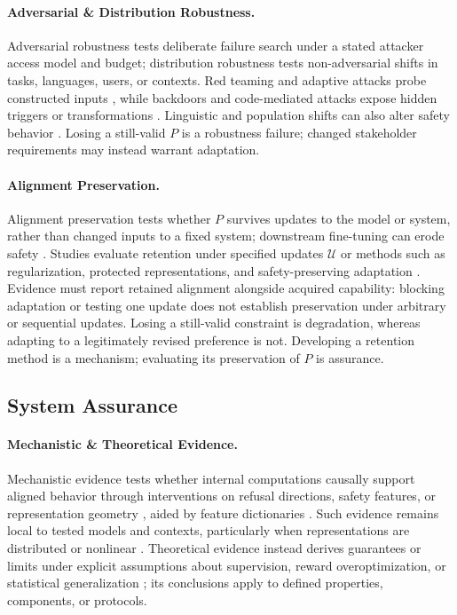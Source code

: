 \documentclass[11pt]{article}
\begin{document}
\paragraph{Adversarial \& Distribution Robustness.}
Adversarial robustness tests deliberate failure search under a stated attacker access model and budget; distribution robustness tests non-adversarial shifts in tasks, languages, users, or contexts. Red teaming and adaptive attacks probe constructed inputs \citep{mazeika2024harmbench,andriushchenko2025adaptive}, while backdoors and code-mediated attacks expose hidden triggers or transformations \citep{wang2024backdooralign,ren2024codeattack}. Linguistic and population shifts can also alter safety behavior \citep{long2026languagegames,brito2026safetyisnotuniversal,choi2026context}. Losing a still-valid \(P\) is a robustness failure; changed stakeholder requirements may instead warrant adaptation.

\paragraph{Alignment Preservation.}
Alignment preservation tests whether \(P\) survives updates to the model or system, rather than changed inputs to a fixed system; downstream fine-tuning can erode safety \citep{qi2024finetuning}. Studies evaluate retention under specified updates \(\mathcal{U}\) or methods such as regularization, protected representations, and safety-preserving adaptation \citep{lyu2024keeping,huang2024vaccine,li2025salora,wang2025lifelong}. Evidence must report retained alignment alongside acquired capability: blocking adaptation or testing one update does not establish preservation under arbitrary or sequential updates. Losing a still-valid constraint is degradation, whereas adapting to a legitimately revised preference is not. Developing a retention method is a mechanism; evaluating its preservation of \(P\) is assurance.

\subsection{System Assurance}
\label{subsec:system-assurance}

\paragraph{Mechanistic \& Theoretical Evidence.}
Mechanistic evidence tests whether internal computations causally support aligned behavior through interventions on refusal directions, safety features, or representation geometry \citep{arditi2024refusal,chen2025safetyneurons,wollschlager2025geometry}, aided by feature dictionaries \citep{templeton2024scaling,lieberum2024gemmascope}. Such evidence remains local to tested models and contexts, particularly when representations are distributed or nonlinear \citep{engels2024notalllinear,sharkey2025openproblems}. Theoretical evidence instead derives guarantees or limits under explicit assumptions about supervision, reward overoptimization, or statistical generalization \citep{wolf2024limitations,rafailov2024overoptimization,liu2026statisticalalignment}; its conclusions apply to defined properties, components, or protocols.
\end{document}

